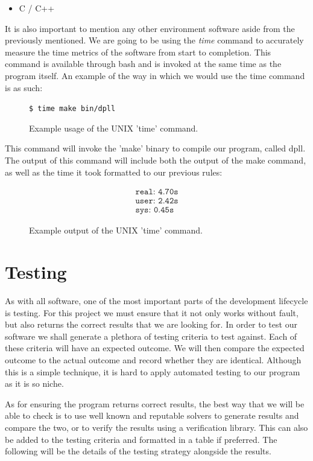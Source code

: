 \documentclass{article}
\begin{document}
\begin{itemize}
    \item C / C++
\end{itemize}

It is also important to mention any other environment software aside from the previously mentioned. We are going to be using the
\textit{time} command to accurately measure the time metrics of the software from start to completion. This command is available
through bash and is invoked at the same time as the program itself. An example of the way in which we would use the time command
is as such:

\begin{figure}[h]
    \centering
    \texttt{\$ time make bin/dpll}
    \caption{Example usage of the UNIX 'time' command.}
\end{figure}

This command will invoke the 'make' binary to compile our program, called dpll. The output of this command will include both the
output of the make command, as well as the time it took formatted to our previous rules:

\begin{figure}[h]
    \centering
    \begin{align*}
        \texttt{real: 4.70s} \\
        \texttt{user: 2.42s} \\
        \texttt{sys: 0.45s}
    \end{align*}
    \caption{Example output of the UNIX 'time' command.}
\end{figure}


\section{Testing}
As with all software, one of the most important parts of the development lifecycle is testing. For
this project we must ensure that it not only works without fault, but also returns the correct
results that we are looking for. In order to test our software we shall generate a plethora of
testing criteria to test against. Each of these criteria will have an expected outcome. We will then
compare the expected outcome to the actual outcome and record whether they are identical. Although
this is a simple technique, it is hard to apply automated testing to our program as it is so niche.

As for ensuring the program returns correct results, the best way that we will be able to check is
to use well known and reputable solvers to generate results and compare the two, or to verify the results using a verification
library. This can also be added to the testing criteria and formatted in a table if preferred. The following will be the
details of the testing strategy alongside the results.
\end{document}
